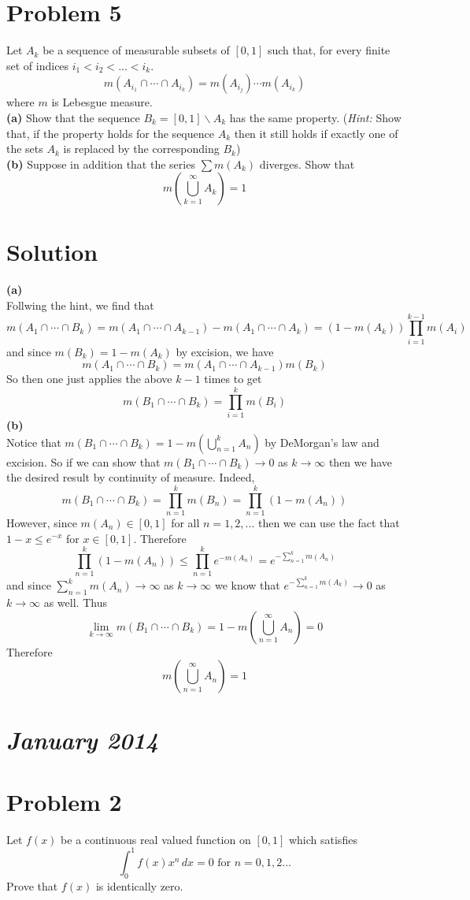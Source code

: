 \documentclass{article}
\newcommand{\bs}{\backslash}
\begin{document}
\section*{Problem 5}
Let $A_k$ be a sequence of measurable subsets of $[0,1]$ such that, for every finite set of indices $i_1<i_2<...<i_k$.\\
$$m(A_{i_1}\cap\cdots\cap A_{i_k})=m(A_{i_j})\cdots m(A_{i_k})$$
where $m$ is Lebesgue measure.\\
\textbf{(a)} Show that the sequence $B_k=[0,1]\bs A_k$ has the same property. (\textit{Hint:} Show that, if the property holds for the sequence $A_k$ then it still holds if exactly one of the sets $A_k$ is replaced by the corresponding $B_k$)\\
\textbf{(b)} Suppose in addition that the series $\sum m(A_k)$ diverges. Show that
$$m\left(\bigcup_{k=1}^\infty A_k\right)=1$$
\section*{Solution}
\textbf{(a)}\\
Follwing the hint, we find that
$$m(A_1\cap\cdots \cap B_k)=m(A_1\cap\cdots\cap A_{k-1})-m(A_1\cap\cdots \cap A_k)=(1-m(A_k))\prod_{i=1}^{k-1}m(A_i)$$
and since $m(B_k)=1-m(A_k)$ by excision, we have
$$m(A_1\cap\cdots \cap B_k)=m(A_1\cap\cdots \cap A_{k-1})m(B_k)$$
So then one just applies the above $k-1$ times to get 
$$m(B_1\cap\cdots\cap B_k)=\prod_{i=1}^km(B_i)$$
\textbf{(b)}\\
Notice that $m(B_1\cap\cdots\cap B_k)=1-m\left(\bigcup_{n=1}^k A_n\right)$ by DeMorgan's law and excision. So if we can show that $m(B_1\cap\cdots\cap B_k)\to0$ as $k\to\infty$ then we have the desired result by continuity of measure. Indeed, 
$$m(B_1\cap\cdots\cap B_k)=\prod_{n=1}^km(B_n)=\prod_{n=1}^k(1-m(A_n))$$
However, since $m(A_n)\in[0,1]$ for all $n=1,2,...$ then we can use the fact that $1-x\leq e^{-x}$ for $x\in[0,1]$. Therefore
$$\prod_{n=1}^k(1-m(A_n))\leq\prod_{n=1}^k e^{-m(A_n)}=e^{-\sum_{n=1}^k m(A_n)}$$
and since $\sum_{n=1}^k m(A_n)\to\infty$ as $k\to\infty$ we know that $e^{-\sum_{n=1}^k m(A_k)}\to 0$ as $k\to\infty$ as well. Thus
$$\lim_{k\to\infty}m(B_1\cap\cdots\cap B_k)=1-m\left(\bigcup_{n=1}^\infty A_n \right)=0$$
Therefore
$$m\left(\bigcup_{n=1}^\infty A_n \right)=1$$
 
\section*{{\it January 2014}}
\section*{Problem 2}
Let $f(x)$ be a continuous real valued function on $[0,1]$ which satisfies
$$\int_0^1 f(x)x^n\,dx=0\text{ for }n=0,1,2...$$
Prove that $f(x)$ is identically zero.
\end{document}
